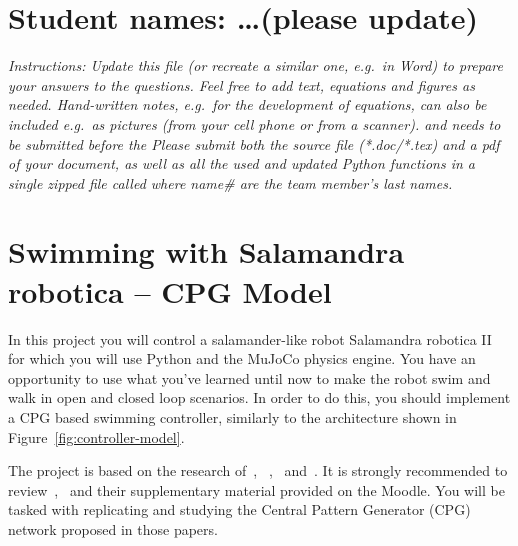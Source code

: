 \documentclass{cmc}
\begin{document}
\pagestyle{fancy}
 

\section*{Student names: \ldots (please update)}

\textit{Instructions: Update this file (or recreate a similar one, e.g.\ in
  Word) to prepare your answers to the questions. Feel free to add text,
  equations and figures as needed. Hand-written notes, e.g.\ for the development
  of equations, can also be included e.g.\ as pictures (from your cell phone or
  from a scanner).  \textbf{} and needs to be
  submitted before the \textbf{} Please submit both the source file (*.doc/*.tex)
  and a pdf of your document, as well as all the used and updated Python
  functions in a single zipped file called
   where name\# are the team
  member’s last names.  }
\\

\section*{Swimming with Salamandra robotica – CPG Model}
\label{sec:exploring-swimming}

In this project you will control a salamander-like robot Salamandra
robotica II for which you will use Python and the MuJoCo physics
engine. You have an opportunity to use what you’ve learned until
now to make the robot swim and walk in open and closed loop scenarios.
In order to do this, you should implement a CPG based swimming controller,
similarly to the architecture shown in Figure~\ref{fig:controller-model}.

The project is based on the research of~\cite{Crespi2013},
~\cite{Karakasiliotis2013},~\cite{ijspeert2007swimming}
and~\cite{thandiackal2021emergence}. It is strongly recommended to
review~\cite{ijspeert2007swimming},~\cite{thandiackal2021emergence} and their
supplementary material provided on the Moodle.
You will be tasked with replicating and studying the
Central Pattern Generator (CPG) network proposed in those papers.
\end{document}
